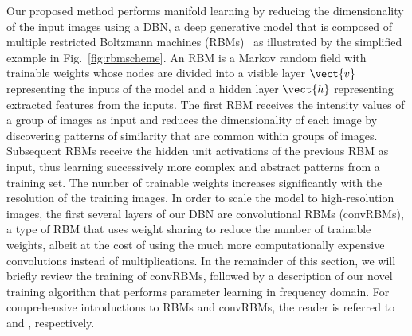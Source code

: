 Our proposed method performs manifold learning by reducing the dimensionality of
the input images using a DBN, a deep generative model that is composed of
multiple restricted Boltzmann machines (RBMs)~\cite{Hinton2006b} as illustrated
by the simplified example in Fig.~\ref{fig:rbmscheme}.
An RBM is a Markov random
field with trainable weights whose nodes are divided into a visible layer
$\vect{v}$ representing the inputs of the model and a hidden layer $\vect{h}$
representing extracted features from the inputs. The first RBM receives the
intensity values of a group of images as input and reduces the dimensionality of
each image by discovering patterns of similarity that are common within groups
of images. Subsequent RBMs receive the hidden unit activations of the previous
RBM as input, thus learning successively more complex and abstract patterns from
a training set. The number of trainable weights increases significantly with the
resolution of the training images. In order to scale the model to
high-resolution images, the first several layers of our DBN are convolutional
RBMs (convRBMs), a type of RBM that uses weight sharing to reduce the number of
trainable weights, albeit at the cost of using the much more computationally
expensive convolutions instead of multiplications. In the remainder of this
section, we will briefly review the training of convRBMs, followed by a
description of our novel training algorithm that performs parameter learning in
frequency domain. For comprehensive introductions to RBMs and convRBMs, the
reader is referred to \cite{Hinton2006b} and \cite{Lee2011}, respectively.

